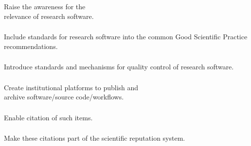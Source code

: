\documentclass{beamer}
\begin{document}
\begin{frame}
  \frametitle{}
  \begin{block}{}
    \begin{center}
      Raise the awareness for the\\relevance of research software.
    \end{center}
  \end{block}
\end{frame}

\begin{frame}
  \frametitle{}
  \begin{block}{}
    \begin{center}
      Include standards for research software into the common Good
      Scientific Practice recommendations.
    \end{center}
  \end{block}
\end{frame}

\begin{frame}
  \frametitle{}
  \begin{block}{}
    \begin{center}
      Introduce standards and mechanisms for quality control of
      research software.
    \end{center}
  \end{block}
\end{frame}

\begin{frame}
  \frametitle{}
  \begin{block}{}
    \begin{center}
      Create institutional platforms to publish and\\archive software/source
      code/workflows.
    \end{center}
  \end{block}
\end{frame}

\begin{frame}
  \frametitle{}
  \begin{block}{}
    \begin{center}
      Enable citation of such items.
    \end{center}
  \end{block}
\end{frame}

\begin{frame}
  \frametitle{}
  \begin{block}{}
    \begin{center}
      Make these citations part of the scientific reputation system.
    \end{center}
  \end{block}
\end{frame}
\end{document}
